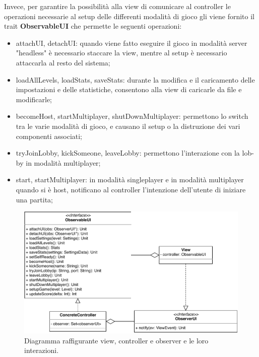Invece, per garantire la possibilità alla view di comunicare al controller le operazioni necessarie al setup delle differenti modalità di gioco gli viene fornito il trait \textbf{ObservableUI} che permette le seguenti operazioni:
\begin{itemize}
    \item attachUI, detachUI: quando viene fatto eseguire il gioco in modalità server "headless" è necessario staccare la view, mentre al setup è necessario attaccarla al resto del sistema;
    \item loadAllLevels, loadStats, saveStats: durante la modifica e il caricamento delle impostazioni e delle statistiche, consentono alla view di caricarle da file e modificarle;
    \item becomeHost, startMultiplayer, shutDownMultiplayer: permettono lo switch tra le varie modalità di gioco, e causano il setup o la distruzione dei vari componenti associati;
    \item tryJoinLobby, kickSomeone, leaveLobby: permettono l'interazione con la lob-by in modalità multiplayer;
    \item start, startMultiplayer: in modalità singleplayer e in modalità multiplayer quando si è host, notificano al controller l'intenzione dell'utente di iniziare una partita;
\end{itemize}




\begin{figure}[H]
	\centering
	\includegraphics[width=\columnwidth]{drawio/view-controller-observer/view-controller-observer.pdf}
	\caption{Diagramma raffigurante view, controller e observer e le loro interazioni.}
	\label{fig:view-controller-observer}
\end{figure}